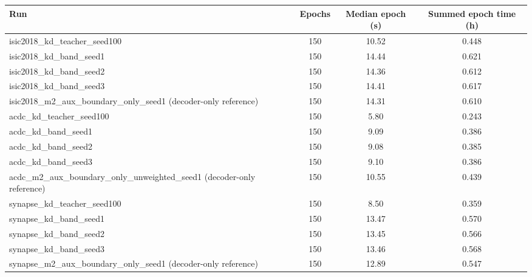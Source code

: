 \begin{tabular}{lccc}
\toprule
Run & Epochs & Median epoch (s) & Summed epoch time (h) \\
\midrule
isic2018\_kd\_teacher\_seed100 & 150 & 10.52 & 0.448 \\
isic2018\_kd\_band\_seed1 & 150 & 14.44 & 0.621 \\
isic2018\_kd\_band\_seed2 & 150 & 14.36 & 0.612 \\
isic2018\_kd\_band\_seed3 & 150 & 14.41 & 0.617 \\
isic2018\_m2\_aux\_boundary\_only\_seed1 (decoder-only reference) & 150 & 14.31 & 0.610 \\
acdc\_kd\_teacher\_seed100 & 150 & 5.80 & 0.243 \\
acdc\_kd\_band\_seed1 & 150 & 9.09 & 0.386 \\
acdc\_kd\_band\_seed2 & 150 & 9.08 & 0.385 \\
acdc\_kd\_band\_seed3 & 150 & 9.10 & 0.386 \\
acdc\_m2\_aux\_boundary\_only\_unweighted\_seed1 (decoder-only reference) & 150 & 10.55 & 0.439 \\
synapse\_kd\_teacher\_seed100 & 150 & 8.50 & 0.359 \\
synapse\_kd\_band\_seed1 & 150 & 13.47 & 0.570 \\
synapse\_kd\_band\_seed2 & 150 & 13.45 & 0.566 \\
synapse\_kd\_band\_seed3 & 150 & 13.46 & 0.568 \\
synapse\_m2\_aux\_boundary\_only\_seed1 (decoder-only reference) & 150 & 12.89 & 0.547 \\
\bottomrule
\end{tabular}
